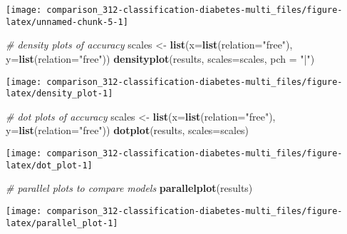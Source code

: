 \documentclass[]{book}
\newenvironment{Shaded}{\begin{snugshade}}{\end{snugshade}}
\newcommand{\CommentTok}[1]{\textcolor[rgb]{0.56,0.35,0.01}{\textit{#1}}}
\newcommand{\DataTypeTok}[1]{\textcolor[rgb]{0.13,0.29,0.53}{#1}}
\newcommand{\KeywordTok}[1]{\textcolor[rgb]{0.13,0.29,0.53}{\textbf{#1}}}
\newcommand{\NormalTok}[1]{#1}
\newcommand{\StringTok}[1]{\textcolor[rgb]{0.31,0.60,0.02}{#1}}
\begin{document}
\begin{center}\texttt{[image: comparison\_312-classification-diabetes-multi\_files/figure-latex/unnamed-chunk-5-1]} \end{center}

\begin{Shaded}
\begin{Highlighting}[]
\CommentTok{# density plots of accuracy}
\NormalTok{scales <-}\StringTok{ }\KeywordTok{list}\NormalTok{(}\DataTypeTok{x=}\KeywordTok{list}\NormalTok{(}\DataTypeTok{relation=}\StringTok{"free"}\NormalTok{), }\DataTypeTok{y=}\KeywordTok{list}\NormalTok{(}\DataTypeTok{relation=}\StringTok{"free"}\NormalTok{))}
\KeywordTok{densityplot}\NormalTok{(results, }\DataTypeTok{scales=}\NormalTok{scales, }\DataTypeTok{pch =} \StringTok{"|"}\NormalTok{)}
\end{Highlighting}
\end{Shaded}

\begin{center}\texttt{[image: comparison\_312-classification-diabetes-multi\_files/figure-latex/density\_plot-1]} \end{center}

\begin{Shaded}
\begin{Highlighting}[]
\CommentTok{# dot plots of accuracy}
\NormalTok{scales <-}\StringTok{ }\KeywordTok{list}\NormalTok{(}\DataTypeTok{x=}\KeywordTok{list}\NormalTok{(}\DataTypeTok{relation=}\StringTok{"free"}\NormalTok{), }\DataTypeTok{y=}\KeywordTok{list}\NormalTok{(}\DataTypeTok{relation=}\StringTok{"free"}\NormalTok{))}
\KeywordTok{dotplot}\NormalTok{(results, }\DataTypeTok{scales=}\NormalTok{scales)}
\end{Highlighting}
\end{Shaded}

\begin{center}\texttt{[image: comparison\_312-classification-diabetes-multi\_files/figure-latex/dot\_plot-1]} \end{center}

\begin{Shaded}
\begin{Highlighting}[]
\CommentTok{# parallel plots to compare models}
\KeywordTok{parallelplot}\NormalTok{(results)}
\end{Highlighting}
\end{Shaded}

\begin{center}\texttt{[image: comparison\_312-classification-diabetes-multi\_files/figure-latex/parallel\_plot-1]} \end{center}
\end{document}
